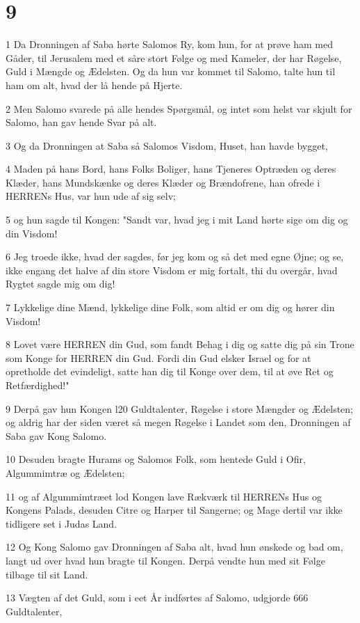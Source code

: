 \chapter{9}

\par 1 Da Dronningen af Saba hørte Salomos Ry, kom hun, for at prøve ham med Gåder, til Jerusalem med et såre stort Følge og med Kameler, der har Røgelse, Guld i Mængde og Ædelsten. Og da hun var kommet til Salomo, talte hun til ham om alt, hvad der lå hende på Hjerte.
\par 2 Men Salomo svarede på alle hendes Spørgsmål, og intet som helst var skjult for Salomo, han gav hende Svar på alt.
\par 3 Og da Dronningen at Saba så Salomos Visdom, Huset, han havde bygget,
\par 4 Maden på hans Bord, hans Folks Boliger, hans Tjeneres Optræden og deres Klæder, hans Mundskænke og deres Klæder og Brændofrene, han ofrede i HERRENs Hus, var hun ude af sig selv;
\par 5 og hun sagde til Kongen: "Sandt var, hvad jeg i mit Land hørte sige om dig og din Visdom!
\par 6 Jeg troede ikke, hvad der sagdes, før jeg kom og så det med egne Øjne; og se, ikke engang det halve af din store Visdom er mig fortalt, thi du overgår, hvad Rygtet sagde mig om dig!
\par 7 Lykkelige dine Mænd, lykkelige dine Folk, som altid er om dig og hører din Visdom!
\par 8 Lovet være HERREN din Gud, som fandt Behag i dig og satte dig på sin Trone som Konge for HERREN din Gud. Fordi din Gud elsker Israel og for at opretholde det evindeligt, satte han dig til Konge over dem, til at øve Ret og Retfærdighed!"
\par 9 Derpå gav hun Kongen l20 Guldtalenter, Røgelse i store Mængder og Ædelsten; og aldrig har der siden været så megen Røgelse i Landet som den, Dronningen af Saba gav Kong Salomo.
\par 10 Desuden bragte Hurams og Salomos Folk, som hentede Guld i Ofir, Algummimtræ og Ædelsten;
\par 11 og af Algummimtræet lod Kongen lave Rækværk til HERRENs Hus og Kongens Palads, desuden Citre og Harper til Sangerne; og Mage dertil var ikke tidligere set i Judas Land.
\par 12 Og Kong Salomo gav Dronningen af Saba alt, hvad hun ønskede og bad om, langt ud over hvad hun bragte til Kongen. Derpå vendte hun med sit Følge tilbage til sit Land.
\par 13 Vægten af det Guld, som i eet År indførtes af Salomo, udgjorde 666 Guldtalenter,
